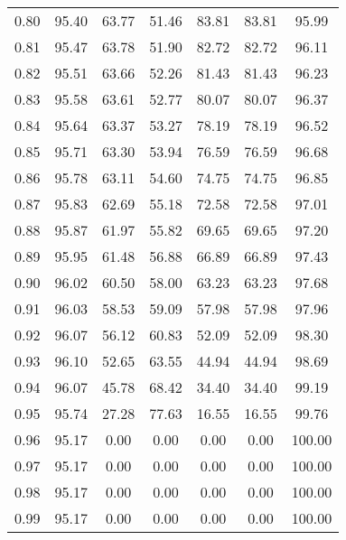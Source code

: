 \begin{tabular}{|c|c|c|c|c|c|c|}
      0.80 &     95.40 &     63.77 &      51.46 &   83.81 &      83.81 &         95.99 \\
      0.81 &     95.47 &     63.78 &      51.90 &   82.72 &      82.72 &         96.11 \\
      0.82 &     95.51 &     63.66 &      52.26 &   81.43 &      81.43 &         96.23 \\
      0.83 &     95.58 &     63.61 &      52.77 &   80.07 &      80.07 &         96.37 \\
      0.84 &     95.64 &     63.37 &      53.27 &   78.19 &      78.19 &         96.52 \\
      0.85 &     95.71 &     63.30 &      53.94 &   76.59 &      76.59 &         96.68 \\
      0.86 &     95.78 &     63.11 &      54.60 &   74.75 &      74.75 &         96.85 \\
      0.87 &     95.83 &     62.69 &      55.18 &   72.58 &      72.58 &         97.01 \\
      0.88 &     95.87 &     61.97 &      55.82 &   69.65 &      69.65 &         97.20 \\
      0.89 &     95.95 &     61.48 &      56.88 &   66.89 &      66.89 &         97.43 \\
      0.90 &     96.02 &     60.50 &      58.00 &   63.23 &      63.23 &         97.68 \\
      0.91 &     96.03 &     58.53 &      59.09 &   57.98 &      57.98 &         97.96 \\
      0.92 &     96.07 &     56.12 &      60.83 &   52.09 &      52.09 &         98.30 \\
      0.93 &     96.10 &     52.65 &      63.55 &   44.94 &      44.94 &         98.69 \\
      0.94 &     96.07 &     45.78 &      68.42 &   34.40 &      34.40 &         99.19 \\
      0.95 &     95.74 &     27.28 &      77.63 &   16.55 &      16.55 &         99.76 \\
      0.96 &     95.17 &      0.00 &       0.00 &    0.00 &       0.00 &        100.00 \\
      0.97 &     95.17 &      0.00 &       0.00 &    0.00 &       0.00 &        100.00 \\
      0.98 &     95.17 &      0.00 &       0.00 &    0.00 &       0.00 &        100.00 \\
      0.99 &     95.17 &      0.00 &       0.00 &    0.00 &       0.00 &        100.00 \\
\bottomrule
\end{tabular}
